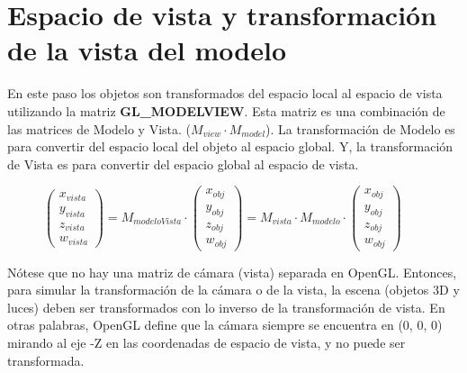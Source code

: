 \chapter{Espacio de vista y transformación de la vista del modelo}
En este paso los objetos son transformados del espacio local al espacio de vista utilizando la matriz \textbf{GL\_MODELVIEW}. Esta matriz es una combinación de las matrices de Modelo y Vista. (\(M_{view} \cdot M_{model}\)). La transformación de Modelo es para convertir del espacio local del objeto al espacio global. Y, la transformación de Vista es para convertir del espacio global al espacio de vista.

\begin{figure}[ht]
  \centering
  \(
  \begin{pmatrix}
    x_{vista}\\y_{vista}\\z_{vista}\\w_{vista}
  \end{pmatrix}
  = M_{modeloVista} \cdot
  \begin{pmatrix}
    x_{obj}\\y_{obj}\\z_{obj}\\w_{obj}
  \end{pmatrix}
  = M_{vista} \cdot M_{modelo} \cdot
  \begin{pmatrix}
    x_{obj}\\y_{obj}\\z_{obj}\\w_{obj}
  \end{pmatrix}
  \)
\end{figure}

Nótese que no hay una matriz de cámara (vista) separada en OpenGL. Entonces, para simular la transformación de la cámara o de la vista, la escena (objetos 3D y luces) deben ser transformados con lo inverso de la transformación de vista. En otras palabras, OpenGL define que la cámara siempre se encuentra en (0, 0, 0) mirando al eje -Z en las coordenadas de espacio de vista, y no puede ser transformada.

\newpage

